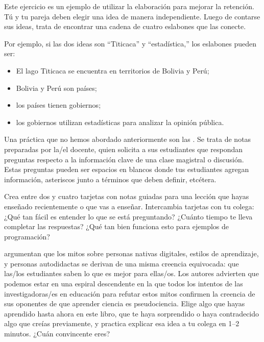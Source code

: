 
Este ejercicio es un ejemplo de utilizar la elaboración para mejorar la retención.
Tú y tu pareja deben elegir una idea de manera independiente.
Luego de contarse sus ideas,
trata de encontrar una cadena de cuatro eslabones
que las conecte.

Por ejemplo,
si las dos ideas son ``Titicaca'' y ``estadística,''
los eslabones pueden ser:

\begin{itemize}

\item
  El lago Titicaca se encuentra en territorios de Bolivia y Perú;

\item
  Bolivia y Perú son países;

\item
 los países tienen gobiernos;

\item
  los gobiernos utilizan estadísticas para analizar la opinión pública.

\end{itemize}


Una práctica que no hemos abordado anteriormente son las .
Se trata de notas preparadas por la/el docente,
quien solicita a sus estudiantes que respondan preguntas respecto a la información clave de una clase magistral o discusión.
Estas preguntas pueden ser espacios en blancos donde tus estudiantes agregan información,
asteriscos junto a términos que deben definir,
etcétera.

Crea entre dos y cuatro tarjetas con notas guiadas para una lección que hayas enseñado recientemente
o que vas a enseñar.
Intercambia tarjetas con tu colega:
¿Qué tan fácil es entender lo que se está preguntando?
¿Cuánto tiempo te lleva completar las respuestas?
¿Qué tan bien funciona esto para ejemplos de programación?


\cite{Kirs2013} argumentan que los mitos sobre personas nativas digitales,
estilos de aprendizaje,
y personas autodidactas se derivan de una misma creencia equivocada: que
las/los estudiantes saben lo que es mejor para ellas/os.
Los autores advierten que podemos estar en una espiral descendente
en la que todos los intentos de las investigadoras/es en educación para refutar estos mitos
confirmen la creencia de sus oponentes de que aprender ciencia es pseudociencia.
Elige algo que hayas aprendido hasta ahora en este libro,
que te haya sorprendido o haya contradecido algo que creías previamente,
y practica explicar esa idea a tu colega en 1--2 minutos.
¿Cuán convincente eres?

